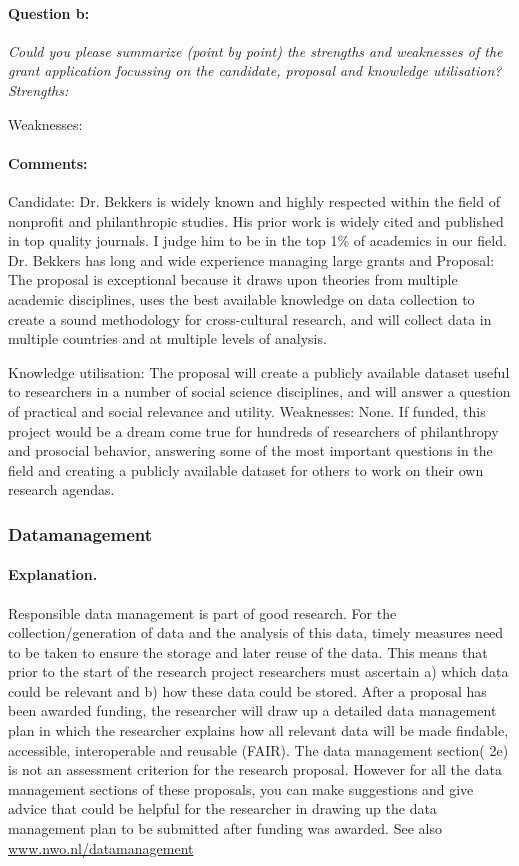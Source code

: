 \documentclass[twocolumn, serif, rga, numeric]{jote-article}
\begin{document}
\paragraph{Question b:}
\textit{Could you please summarize (point by point) the strengths and weaknesses of the grant application focussing on the candidate, proposal and knowledge utilisation? Strengths:}

\noindent Weaknesses:
\paragraph{Comments:}
Candidate: Dr. Bekkers is widely known and highly respected within the field of nonprofit and philanthropic studies. His prior work is widely cited and published in top quality journals. I judge him to be in the top 1\% of academics in our field. Dr. Bekkers has long and wide experience managing large grants and Proposal: The proposal is exceptional because it draws upon theories from multiple academic disciplines, uses the best available knowledge on data collection to create a sound methodology for cross-cultural research, and will collect data in multiple countries and at multiple levels of analysis.

Knowledge utilisation: The proposal will create a publicly available dataset useful to researchers in a number of social science disciplines, and will answer a question of practical and social relevance and utility.
Weaknesses: None. If funded, this project would be a dream come true for hundreds of researchers of philanthropy and prosocial behavior, answering some of the most important questions in the field and creating a publicly available dataset for others to work on their own research agendas.
 {}\subsubsection*{Datamanagement} 
\paragraph{Explanation.}
Responsible data management is part of good research. For the collection/generation of data and the analysis of this data, timely measures need to be taken to ensure the storage and later reuse of the data. This means that prior to the start of the research project researchers must ascertain a) which data could be relevant and b) how these data could be stored. After a proposal has been awarded funding, the researcher will draw up a detailed data management plan in which the researcher explains how all relevant data will be made findable, accessible, interoperable and reusable (FAIR). The data management section( 2e) is not an assessment criterion for the research proposal. However for all the data management sections of these proposals, you can make suggestions and give advice that could be helpful for the researcher in drawing up the data management plan to be submitted after funding was awarded. See also \href{www.nwo.nl/datamanagement}{www.nwo.nl/datamanagement}
\end{document}
